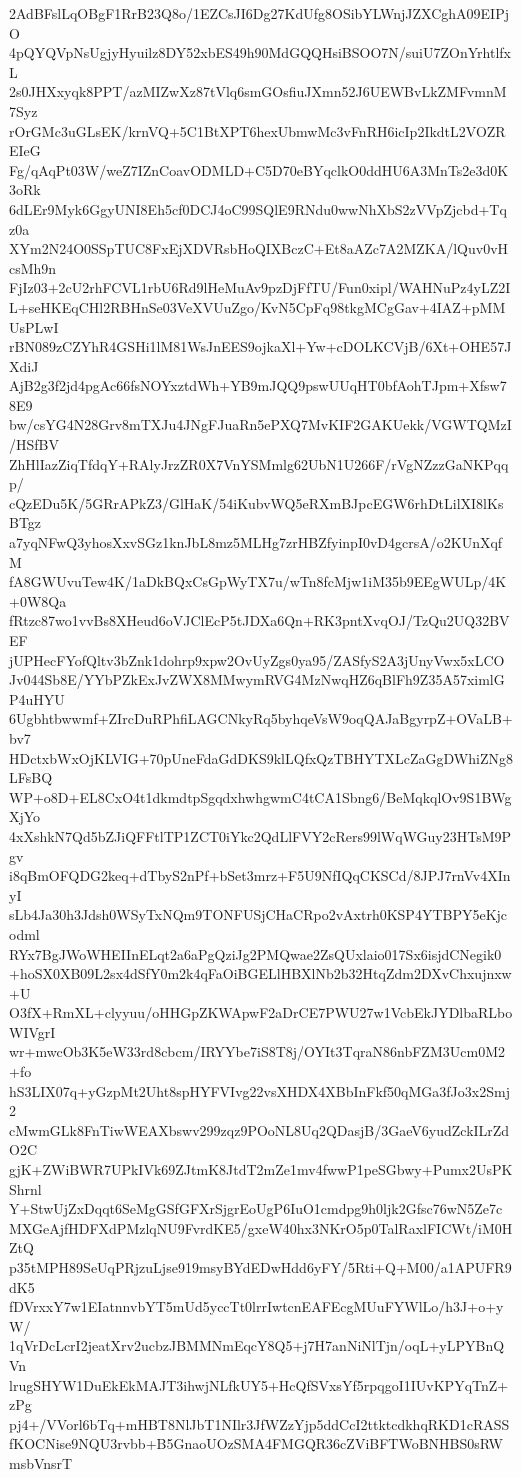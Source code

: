 2AdBFslLqOBgF1RrB23Q8o/1EZCsJI6Dg27KdUfg8OSibYLWnjJZXCghA09EIPjO
4pQYQVpNsUgjyHyuilz8DY52xbES49h90MdGQQHsiBSOO7N/suiU7ZOnYrhtlfxL
2s0JHXxyqk8PPT/azMIZwXz87tVlq6smGOsfiuJXmn52J6UEWBvLkZMFvmnM7Syz
rOrGMc3uGLsEK/krnVQ+5C1BtXPT6hexUbmwMc3vFnRH6icIp2IkdtL2VOZREIeG
Fg/qAqPt03W/weZ7IZnCoavODMLD+C5D70eBYqclkO0ddHU6A3MnTs2e3d0K3oRk
6dLEr9Myk6GgyUNI8Eh5cf0DCJ4oC99SQlE9RNdu0wwNhXbS2zVVpZjcbd+Tqz0a
XYm2N24O0SSpTUC8FxEjXDVRsbHoQIXBczC+Et8aAZc7A2MZKA/lQuv0vHcsMh9n
FjIz03+2cU2rhFCVL1rbU6Rd9lHeMuAv9pzDjFfTU/Fun0xipl/WAHNuPz4yLZ2I
L+seHKEqCHl2RBHnSe03VeXVUuZgo/KvN5CpFq98tkgMCgGav+4IAZ+pMMUsPLwI
rBN089zCZYhR4GSHi1lM81WsJnEES9ojkaXl+Yw+cDOLKCVjB/6Xt+OHE57JXdiJ
AjB2g3f2jd4pgAc66fsNOYxztdWh+YB9mJQQ9pswUUqHT0bfAohTJpm+Xfsw78E9
bw/csYG4N28Grv8mTXJu4JNgFJuaRn5ePXQ7MvKIF2GAKUekk/VGWTQMzI/HSfBV
ZhHlIazZiqTfdqY+RAlyJrzZR0X7VnYSMmlg62UbN1U266F/rVgNZzzGaNKPqqp/
cQzEDu5K/5GRrAPkZ3/GlHaK/54iKubvWQ5eRXmBJpcEGW6rhDtLilXI8lKsBTgz
a7yqNFwQ3yhosXxvSGz1knJbL8mz5MLHg7zrHBZfyinpI0vD4gcrsA/o2KUnXqfM
fA8GWUvuTew4K/1aDkBQxCsGpWyTX7u/wTn8fcMjw1iM35b9EEgWULp/4K+0W8Qa
fRtzc87wo1vvBs8XHeud6oVJClEcP5tJDXa6Qn+RK3pntXvqOJ/TzQu2UQ32BVEF
jUPHecFYofQltv3bZnk1dohrp9xpw2OvUyZgs0ya95/ZASfyS2A3jUnyVwx5xLCO
Jv044Sb8E/YYbPZkExJvZWX8MMwymRVG4MzNwqHZ6qBlFh9Z35A57ximlGP4uHYU
6Ugbhtbwwmf+ZIrcDuRPhfiLAGCNkyRq5byhqeVsW9oqQAJaBgyrpZ+OVaLB+bv7
HDctxbWxOjKLVIG+70pUneFdaGdDKS9klLQfxQzTBHYTXLcZaGgDWhiZNg8LFsBQ
WP+o8D+EL8CxO4t1dkmdtpSgqdxhwhgwmC4tCA1Sbng6/BeMqkqlOv9S1BWgXjYo
4xXshkN7Qd5bZJiQFFtlTP1ZCT0iYkc2QdLlFVY2cRers99lWqWGuy23HTsM9Pgv
i8qBmOFQDG2keq+dTbyS2nPf+bSet3mrz+F5U9NfIQqCKSCd/8JPJ7rnVv4XInyI
sLb4Ja30h3Jdsh0WSyTxNQm9TONFUSjCHaCRpo2vAxtrh0KSP4YTBPY5eKjcodml
RYx7BgJWoWHEIInELqt2a6aPgQziJg2PMQwae2ZsQUxlaio017Sx6isjdCNegik0
+hoSX0XB09L2sx4dSfY0m2k4qFaOiBGELlHBXlNb2b32HtqZdm2DXvChxujnxw+U
O3fX+RmXL+clyyuu/oHHGpZKWApwF2aDrCE7PWU27w1VcbEkJYDlbaRLboWIVgrI
wr+mwcOb3K5eW33rd8cbcm/IRYYbe7iS8T8j/OYIt3TqraN86nbFZM3Ucm0M2+fo
hS3LIX07q+yGzpMt2Uht8spHYFVIvg22vsXHDX4XBbInFkf50qMGa3fJo3x2Smj2
cMwmGLk8FnTiwWEAXbswv299zqz9POoNL8Uq2QDasjB/3GaeV6yudZckILrZdO2C
gjK+ZWiBWR7UPkIVk69ZJtmK8JtdT2mZe1mv4fwwP1peSGbwy+Pumx2UsPKShrnl
Y+StwUjZxDqqt6SeMgGSfGFXrSjgrEoUgP6IuO1cmdpg9h0ljk2Gfsc76wN5Ze7c
MXGeAjfHDFXdPMzlqNU9FvrdKE5/gxeW40hx3NKrO5p0TalRaxlFICWt/iM0HZtQ
p35tMPH89SeUqPRjzuLjse919msyBYdEDwHdd6yFY/5Rti+Q+M00/a1APUFR9dK5
fDVrxxY7w1EIatnnvbYT5mUd5yccTt0lrrIwtcnEAFEcgMUuFYWlLo/h3J+o+yW/
1qVrDcLcrI2jeatXrv2ucbzJBMMNmEqcY8Q5+j7H7anNiNlTjn/oqL+yLPYBnQVn
lrugSHYW1DuEkEkMAJT3ihwjNLfkUY5+HcQfSVxsYf5rpqgoI1IUvKPYqTnZ+zPg
pj4+/VVorl6bTq+mHBT8NlJbT1NIlr3JfWZzYjp5ddCcI2ttktcdkhqRKD1cRASS
fKOCNise9NQU3rvbb+B5GnaoUOzSMA4FMGQR36cZViBFTWoBNHBS0sRWmsbVnsrT
